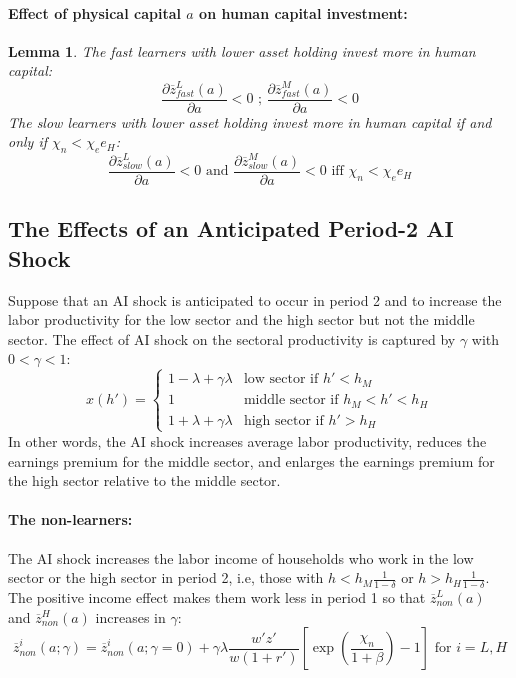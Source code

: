 \documentclass[12pt]{article}
\newtheorem{lemma}{Lemma}
\begin{document}
\paragraph{Effect of physical capital $a$ on human capital investment:} 
\begin{lemma}\label{lem:a_on_e}
The fast learners with lower asset holding invest more in human capital:
\begin{equation*}
    \frac{\partial \overline{z}^L_{fast}(a)}{\partial a}<0 \text{ ; } \frac{\partial \overline{z}^M_{fast}(a)} {\partial a} <0
\end{equation*}
The slow learners with lower asset holding invest more in human capital if and only if $\chi_n<\chi_e e_H$:
\begin{equation*}
    \frac{\partial \overline{z}^L_{slow}(a)}{\partial a}<0 \text{ and } \frac{\partial \overline{z}^M_{slow}(a)}{\partial a}<0 \text{ iff } \chi_n<\chi_e e_H
\end{equation*}
\end{lemma}
    


\subsection{The Effects of an Anticipated Period-2 AI Shock}
Suppose that an AI shock is anticipated to occur in period 2 and to increase the labor productivity for the low sector and the high sector but not the middle sector. The effect of AI shock on the sectoral productivity is captured by $\gamma$ with $0<\gamma<1$:
\begin{equation}
    \label{eq:xAI}
x(h')=\left \{ 
\begin{array}{cl}
1-\lambda + \gamma \lambda & \text{low sector if }h'<h_{M} \\ 
1 & \text{middle sector if }h_{M}<h'<h_{H} \\ 
1+\lambda + \gamma \lambda & \text{high sector if }h'>h_{H}%
\end{array}%
\right. 
\end{equation}
In other words, the AI shock increases average labor productivity, reduces the earnings premium for the middle sector, and enlarges the earnings premium for the high sector relative to the middle sector.

\paragraph{The non-learners:} The AI shock increases the labor income of households who work in the low sector or the high sector in period 2, i.e, those with $h<h_M\frac{1}{1-\delta}$ or $h>h_H\frac{1}{1-\delta}$. The positive income effect makes them work less in period 1 so that $\overline{z}^L_{non}(a)$ and $\overline{z}^H_{non}(a)$ increases in $\gamma$:
\begin{equation*}
    \overline{z}^i_{non}(a;\gamma)=\overline{z}^i_{non}(a;\gamma=0) + \gamma \lambda  \frac{w'z'}{w(1+r')}\left[\exp(\frac{\chi_n}{1+\beta})-1\right] \text{ for } i=L,H
\end{equation*}
\end{document}
